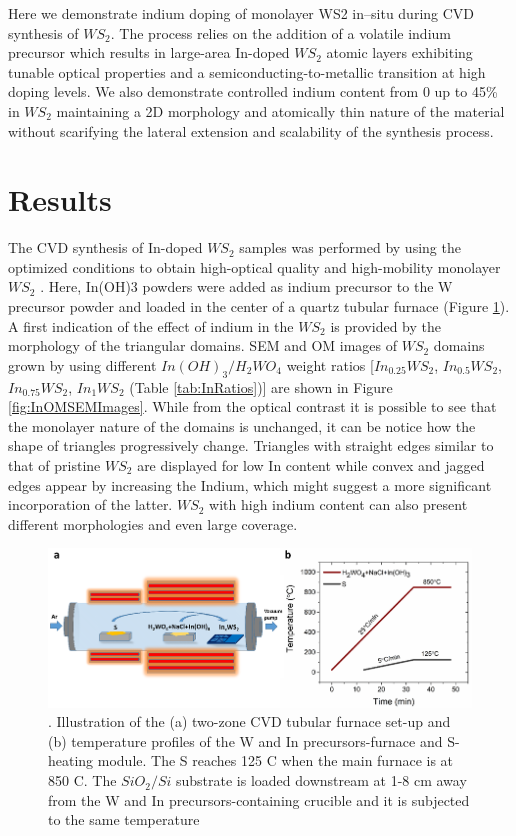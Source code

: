 Here we demonstrate indium doping of monolayer WS2 in–situ during CVD synthesis of $WS_2$. The process relies on the addition of a volatile indium precursor which results in large-area In-doped $WS_2$ atomic layers exhibiting tunable optical properties and a semiconducting-to-metallic transition at high doping levels. We also demonstrate controlled indium content from 0 up to 45\% in $WS_2$ maintaining a 2D morphology and atomically thin nature of the material without scarifying the lateral extension and scalability of the synthesis process.

\section{Results}

The CVD synthesis of In-doped $WS_2$ samples was performed by using the optimized conditions to obtain high-optical quality and high-mobility monolayer $WS_2$ \cite{Reale2017}. Here, In(OH)3 powders were added as indium precursor to the W precursor powder and loaded in the center of a quartz tubular furnace (Figure \ref{fig:InFurnaceSetup}). A first indication of the effect of indium in the $WS_2$ is provided by the morphology of the triangular domains. SEM and OM images of $WS_2$ domains grown by using different $In(OH)_3/H_2WO_4$ weight ratios [$In_{0.25}WS_2$, $In_{0.5}WS_2$, $In_{0.75}WS_2$, $In_1WS_2$ (Table \ref{tab:InRatios})] are shown in Figure \ref{fig:InOMSEMImages}. While from the optical contrast it is possible to see that the monolayer nature of the domains is unchanged, it can be notice how the shape of triangles progressively change. Triangles with straight edges similar to that of pristine $WS_2$ are displayed for low In content while convex and jagged edges appear by increasing the Indium, which might suggest a more significant incorporation of the latter. $WS_2$ with high indium content can also present different morphologies and even large coverage.

\begin{figure}[!h]
	\begin{center}
		\includegraphics[scale=0.5]{In/FurnaceSetup.png}
		\caption{. Illustration of the (a) two-zone CVD tubular furnace set-up and (b) temperature profiles of the W and In precursors-furnace and S-heating module. The S reaches 125 {\degree}C when the main furnace is at 850 {\degree}C. The $SiO_2/Si$ substrate is loaded downstream at 1-8 cm away from the W and In precursors-containing crucible and it is subjected to the same temperature}
		\label{fig:InFurnaceSetup}
	\end{center}
\end{figure}

